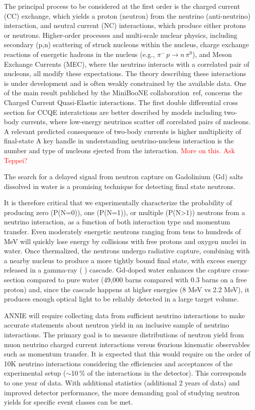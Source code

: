  The principal process to be considered at the first order is the charged current (CC) exchange, %
 which yields a proton (neutron) from the neutrino (anti-neutrino) interaction, %
 and neutral current (NC) interactions, which produce either protons or neutrons. 
 Higher-order processes and multi-scale nuclear physics, including secondary (p,n) scattering %
 of struck nucleons within the nucleus, charge exchange reactions of energetic hadrons %
 in the nucleus (e.g., $\pi^- \, p\rightarrow n \, \pi^0$), and Meson Exchange Currents (MEC), where %
 the neutrino interacts with a correlated pair of nucleons, all modify these expectations.
 The theory describing these interactions is under development and is often weakly constrained %
 by the available data. 
 One of the main result publiched by the MiniBooNE collaboration~ref, concerns the Charged Current %
 Quasi-Elastic interactions.
 The first double differential cross section for CCQE interatctions are better described by models %
 including two-body currents, where low-energy neutrinos scatter off correlated pairs of %
 nucleons.
 A relevant predicted consequence of two-body currents is higher multiplicity of final-state %
 A key handle in understanding neutrino-nucleus interaction is the number and type of nucleons %
 ejected from the interaction.
 \textcolor{red}{More on this. Ask Teppei?}

 The search for a delayed signal from neutron capture on Gadolinium (Gd) salts dissolved in water %
 is a promising technique for detecting final state neutrons.

 It is therefore critical that we experimentally characterize the probability of producing zero %
 (P(N=0)), one (P(N=1)), or multiple (P(N>1)) neutrons from a neutrino interaction, as a function %
 of both interaction type and momentum transfer.
 Even moderately energetic neutrons ranging from tens to hundreds of MeV will quickly lose energy %
 by collisions with free protons and oxygen nuclei in water. 
 Once thermalized, the neutrons undergo radiative capture, combining with a nearby nucleus to %
 produce a more tightly bound final state, with excess energy released in a gamma-ray ( ) cascade. 
 Gd-doped water enhances the capture cross-section compared to pure water %
 (49,000 barns compared with 0.3 barns on a free proton) and, since the cascade happens %
 at higher energies (8 MeV vs 2.2 MeV), it produces enough optical light to be reliably detected in %
 a large target volume.

 ANNIE will require collecting data from sufficient neutrino interactions to make accurate %
 statements about neutron yield in an inclusive sample of neutrino interactions. 
 The primary goal is to measure distributions of neutron yield from muon neutrino charged %
 current interactions versus 6various kinematic observables such as momentum transfer. 
 It is expected that this would require on the order of 10K neutrino interactions considering %
 the efficiencies and acceptances of the experimental setup ($\sim$10\,\% of the interactions %
 in the detector). 
 This corresponds to one year of data. 
 With additional statistics (additional 2 years of data) and improved detector performance, %
 the more demanding goal of studying neutron yields for specific event classes can be met.

